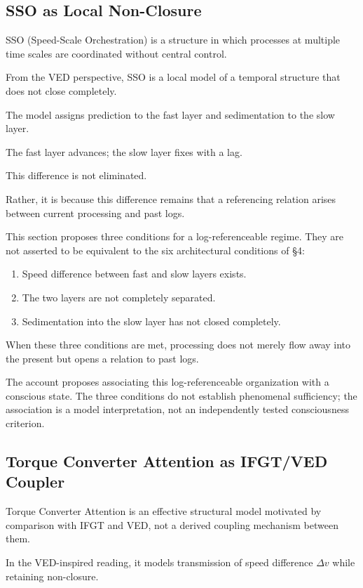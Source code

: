 \subsection{SSO as Local Non-Closure}


SSO (Speed-Scale Orchestration) is a structure in which processes at multiple time scales are coordinated without central control.

From the VED perspective, SSO is a local model of a temporal structure that does not close completely.

The model assigns prediction to the fast layer and sedimentation to the slow layer.

The fast layer advances; the slow layer fixes with a lag.

This difference is not eliminated.

Rather, it is because this difference remains that a referencing relation arises between current processing and past logs.

This section proposes three conditions for a log-referenceable regime. They are not asserted to be equivalent to the six architectural conditions of §4:

\begin{enumerate}
\item Speed difference between fast and slow layers exists.
\item The two layers are not completely separated.
\item Sedimentation into the slow layer has not closed completely.
\end{enumerate}

When these three conditions are met, processing does not merely flow away into the present but opens a relation to past logs.

The account proposes associating this log-referenceable organization with a conscious state. The three conditions do not establish phenomenal sufficiency; the association is a model interpretation, not an independently tested consciousness criterion.

\subsection{Torque Converter Attention as IFGT/VED Coupler}


Torque Converter Attention is an effective structural model motivated by comparison with IFGT and VED, not a derived coupling mechanism between them.

In the VED-inspired reading, it models transmission of speed difference $\Delta v$ while retaining non-closure.

